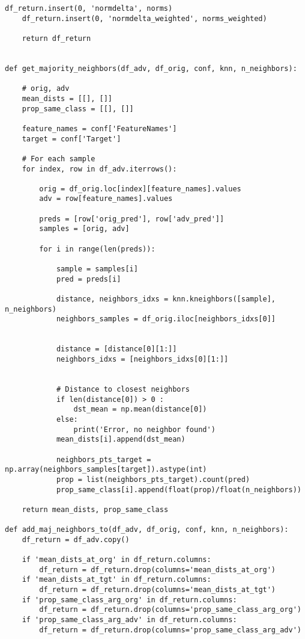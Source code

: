 \begin{lstlisting}[style=python, caption=評価指標の計算を行うMetrics.py]
    df_return.insert(0, 'normdelta', norms)
    df_return.insert(0, 'normdelta_weighted', norms_weighted)
    
    return df_return


def get_majority_neighbors(df_adv, df_orig, conf, knn, n_neighbors):
    
    # orig, adv
    mean_dists = [[], []]
    prop_same_class = [[], []]
    
    feature_names = conf['FeatureNames']
    target = conf['Target']    
    
    # For each sample
    for index, row in df_adv.iterrows():
        
        orig = df_orig.loc[index][feature_names].values
        adv = row[feature_names].values
        
        preds = [row['orig_pred'], row['adv_pred']]
        samples = [orig, adv]
        
        for i in range(len(preds)):
            
            sample = samples[i]
            pred = preds[i]
            
            distance, neighbors_idxs = knn.kneighbors([sample], n_neighbors)
            neighbors_samples = df_orig.iloc[neighbors_idxs[0]]
            
           
            distance = [distance[0][1:]]
            neighbors_idxs = [neighbors_idxs[0][1:]]
            

            # Distance to closest neighbors
            if len(distance[0]) > 0 :
                dst_mean = np.mean(distance[0])
            else:
                print('Error, no neighbor found')
            mean_dists[i].append(dst_mean)
            
            neighbors_pts_target = np.array(neighbors_samples[target]).astype(int)
            prop = list(neighbors_pts_target).count(pred)
            prop_same_class[i].append(float(prop)/float(n_neighbors))
                        
    return mean_dists, prop_same_class

def add_maj_neighbors_to(df_adv, df_orig, conf, knn, n_neighbors):
    df_return = df_adv.copy()
    
    if 'mean_dists_at_org' in df_return.columns:
        df_return = df_return.drop(columns='mean_dists_at_org')
    if 'mean_dists_at_tgt' in df_return.columns:
        df_return = df_return.drop(columns='mean_dists_at_tgt')
    if 'prop_same_class_arg_org' in df_return.columns:
        df_return = df_return.drop(columns='prop_same_class_arg_org')
    if 'prop_same_class_arg_adv' in df_return.columns:
        df_return = df_return.drop(columns='prop_same_class_arg_adv')
        

\end{lstlisting}
